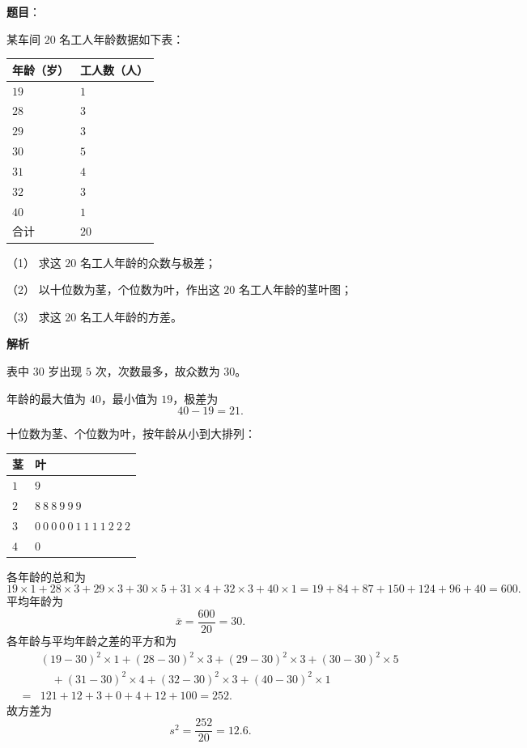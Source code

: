 \begin{answer}

\textbf{题目}：

某车间 $20$ 名工人年龄数据如下表：

\begin{center}
\begin{tabular}{ll}
\toprule
年龄（岁） & 工人数（人） \\
\midrule
$19$ & $1$ \\
$28$ & $3$ \\
$29$ & $3$ \\
$30$ & $5$ \\
$31$ & $4$ \\
$32$ & $3$ \\
$40$ & $1$ \\
合计 & $20$ \\
\bottomrule
\end{tabular}
\end{center}

（1） 求这 $20$ 名工人年龄的众数与极差；

（2） 以十位数为茎，个位数为叶，作出这 $20$ 名工人年龄的茎叶图；

（3） 求这 $20$ 名工人年龄的方差。

\textbf{解析}


表中 $30$ 岁出现 $5$ 次，次数最多，故众数为 $30$。

年龄的最大值为 $40$，最小值为 $19$，极差为
\nopagebreak[4]
\[40-19=21 .\]


十位数为茎、个位数为叶，按年龄从小到大排列：

\begin{center}
\begin{tabular}{ll}
\toprule
茎 & 叶 \\
\midrule
$1$ & $9$ \\
$2$ & $8\ 8\ 8\ 9\ 9\ 9$ \\
$3$ & $0\ 0\ 0\ 0\ 0\ 1\ 1\ 1\ 1\ 2\ 2\ 2$ \\
$4$ & $0$ \\
\bottomrule
\end{tabular}
\end{center}


各年龄的总和为
\nopagebreak[4]
\[19\times1+28\times3+29\times3+30\times5+31\times4+32\times3+40\times1
=19+84+87+150+124+96+40=600 .\]
平均年龄为
\nopagebreak[4]
\[\bar x=\frac{600}{20}=30 .\]
各年龄与平均年龄之差的平方和为
\nopagebreak[4]
\[\begin{aligned}
&(19-30)^2\times1+(28-30)^2\times3+(29-30)^2\times3+(30-30)^2\times5\\
&\quad +(31-30)^2\times4+(32-30)^2\times3+(40-30)^2\times1\\
={}&121+12+3+0+4+12+100=252 .
\end{aligned}\]
故方差为
\nopagebreak[4]
\[s^2=\frac{252}{20}=12.6 .\]


\end{answer}
